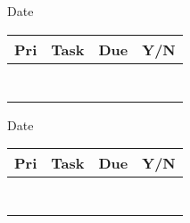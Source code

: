 \documentclass[12pt]{article}
\begin{document}
\thispagestyle{empty}

\begin{flushright}
  \textsf{Date} \makebox[1.50in]{\hrulefill}
\end{flushright}

\begin{table}[htb]
  \begin{center}
    \begin{tabular}{p{0.25in}|p{5.60in}|p{0.75in}|c}
      \textsf{Pri} & \textsf{Task} & \textsf{Due} & \textsf{Y/N}\\ \hline
      &  &  &  \\ [15pt] \hline
      &  &  &  \\ [15pt] \hline
      &  &  &  \\ [15pt] \hline
      &  &  &  \\ [15pt] \hline
      &  &  &  \\ [15pt] \hline
      &  &  &  \\ [15pt] \hline
      &  &  &  \\ [15pt] \hline
    \end{tabular}
  \end{center}
\end{table}

\vspace*{1.25in}
\begin{flushright}
  \textsf{Date} \makebox[1.50in]{\hrulefill}
\end{flushright}

\begin{table}[htb]
  \begin{center}
    \begin{tabular}{p{0.25in}|p{5.60in}|p{0.75in}|c}
      \textsf{Pri} & \textsf{Task} & \textsf{Due} & \textsf{Y/N}\\ \hline
      &  &  &  \\ [15pt] \hline
      &  &  &  \\ [15pt] \hline
      &  &  &  \\ [15pt] \hline
      &  &  &  \\ [15pt] \hline
      &  &  &  \\ [15pt] \hline
      &  &  &  \\ [15pt] \hline
      &  &  &  \\ [15pt] \hline
    \end{tabular}
  \end{center}
\end{table}
\end{document}
